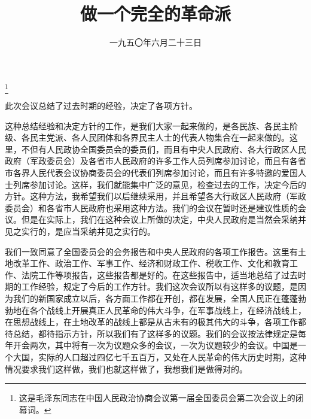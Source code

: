 
\title{做一个完全的革命派}
\date{一九五〇年六月二十三日}
\thanks{这是毛泽东同志在中国人民政治协商会议第一届全国委员会第二次会议上的闭幕词。}
\maketitle


此次会议总结了过去时期的经验，决定了各项方针。

这种总结经验和决定方针的工作，是我们大家一起来做的，是各民族、各民主阶级、各民主党派、各人民团体和各界民主人士的代表人物集合在一起来做的。这里，不但有人民政协全国委员会的委员们，而且有中央人民政府、各大行政区人民政府（军政委员会）及各省市人民政府的许多工作人员列席参加讨论，而且有各省市各界人民代表会议协商委员会的代表们列席参加讨论，而且有许多特邀的爱国人士列席参加讨论。这样，我们就能集中广泛的意见，检查过去的工作，决定今后的方针。这种方法，我希望我们以后继续采用，并且希望各大行政区人民政府（军政委员会）和各省市人民政府也采用这种方法。我们的会议在暂时还是建议性质的会议。但是在实际上，我们在这种会议上所做的决定，中央人民政府是当然会采纳并见之实行的，是应当采纳并见之实行的。

我们一致同意了全国委员会的会务报告和中央人民政府的各项工作报告。这里有土地改革工作、政治工作、军事工作、经济和财政工作、税收工作、文化和教育工作、法院工作等项报告，这些报告都是好的。在这些报告中，适当地总结了过去时期的工作经验，规定了今后的工作方针。我们这次会议所以有这样多的议题，是因为我们的新国家成立以后，各方面工作都在开创，都在发展，全国人民正在蓬蓬勃勃地在各个战线上开展真正人民革命的伟大斗争，在军事战线上，在经济战线上，在思想战线上，在土地改革的战线上都是从古未有的极其伟大的斗争，各项工作都待总结，都待指示方针，所以我们有了这样多的议题。我们的会议按法律规定是每年开会两次，其中将有一次为议题众多的会议，一次为议题较少的会议。中国是一个大国，实际的人口超过四亿七千五百万，又处在人民革命的伟大历史时期，这种情况要求我们这样做，我们也就这样做了，我想我们是做得对的。

